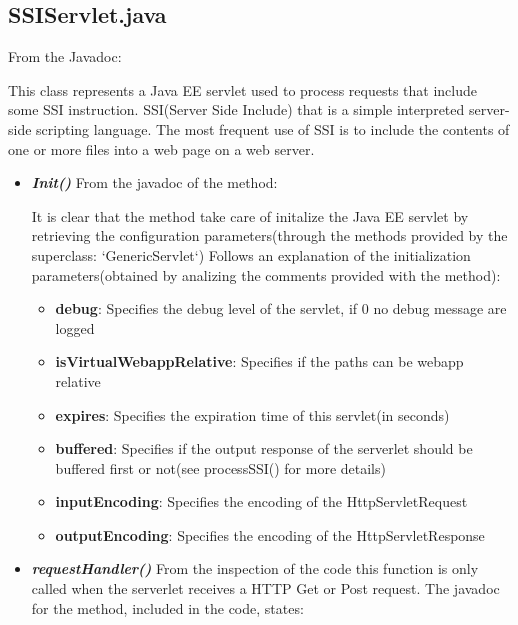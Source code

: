 \documentclass[11pt,titlepage]{article} %
\begin{document}
\subsection{SSIServlet.java}

  From the Javadoc:
  
  

  \noindent This class represents a Java EE servlet used to process requests that include some SSI instruction.\newline
  SSI(Server Side Include) that is a simple interpreted server-side scripting language.
  The most frequent use of SSI is to include the contents of one or more files into a web page on a web server.

  \begin{itemize}
    \item \textbf{\textit{Init()}}
      \newline From the javadoc of the method:
      
      It is clear that the method take care of initalize the Java EE servlet by retrieving the configuration
      parameters(through the methods provided by the superclass: `GenericServlet`)\newline
      Follows an explanation of the initialization parameters(obtained by analizing the comments provided with the method):
      \begin{itemize}
       \item \textbf{debug}:
	Specifies the debug level of the servlet, if 0 no debug message are logged
       \item \textbf{isVirtualWebappRelative}:
	Specifies if the paths can be webapp relative
       \item \textbf{expires}:
	Specifies the expiration time of this servlet(in seconds)
       \item \textbf{buffered}:
	Specifies if the output response of the serverlet should be buffered first or not(see processSSI() for more details)
       \item \textbf{inputEncoding}:
	Specifies the encoding of the HttpServletRequest
       \item \textbf{outputEncoding}:
	Specifies the encoding of the HttpServletResponse
      \end{itemize}

      

    \item \textbf{\textit{requestHandler()}}
      \newline From the inspection of the code this function is only called when the serverlet receives a HTTP Get or Post request.
      The javadoc for the method, included in the code, states:
      

\end{itemize}
\end{document}
